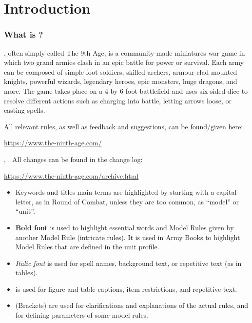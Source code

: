 
\part{Introduction}

\section{What is \nameofthegame{}?}

\nameofthegame{}, often simply called The 9th Age, is a community-made miniatures war game in which two grand armies clash in an epic battle for power or survival. Each army can be composed of simple foot soldiers, skilled archers, armour-clad mounted knights, powerful wizards, legendary heroes, epic monsters, huge dragons, and more. The game takes place on a 4 by 6 foot battlefield and uses six-sided dice to resolve different actions such as charging into battle, letting arrows loose, or casting spells.

All relevant rules, as well as feedback and suggestions, can be found/given here:
\begin{center}
\href{https://www.the-ninth-age.com/}{https://www.the-ninth-age.com/}
\end{center}

, . All changes can be found in the change log:
\begin{center}
\href{https://www.the-ninth-age.com/archive.html}{https://www.the-ninth-age.com/archive.html}
\end{center}

\begin{itemize}[label={-}]
\item

Keywords and titles main terms are highlighted by starting with a capital letter, as in Round of Combat, unless they are too common, as \enquote{model} or \enquote{unit}.

\item

\textbf{Bold font} is used to highlight essential words and Model Rules given by another Model Rule (intricate rules). It is used in Army Books to highlight Model Rules that are defined in the unit profile.

\item

\textit{Italic font} is used for spell names, background text, or repetitive text (as in tables).

\item
{} is used for figure and table captions, item restrictions, and repetitive text.
\item

(Brackets) are used for clarifications and explanations of the actual rules, and for defining parameters of some model rules.

\end{itemize}

